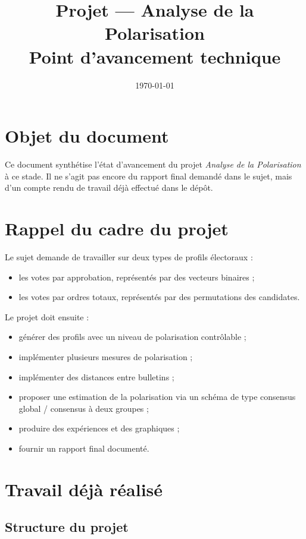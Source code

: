\documentclass[11pt,a4paper]{article}
\title{Projet --- Analyse de la Polarisation\\\large Point d'avancement technique}
\author{}
\date{\today}
\begin{document}
\maketitle

\section{Objet du document}

Ce document synth\'etise l'\'etat d'avancement du projet \emph{Analyse de la Polarisation} \`a ce stade. Il ne s'agit pas encore du rapport final demand\'e dans le sujet, mais d'un compte rendu de travail d\'ej\`a effectu\'e dans le d\'ep\^ot.

\section{Rappel du cadre du projet}

Le sujet demande de travailler sur deux types de profils \'electoraux :
\begin{itemize}[leftmargin=*]
    \item les votes par approbation, repr\'esent\'es par des vecteurs binaires ;
    \item les votes par ordres totaux, repr\'esent\'es par des permutations des candidates.
\end{itemize}

Le projet doit ensuite :
\begin{itemize}[leftmargin=*]
    \item g\'en\'erer des profils avec un niveau de polarisation contr\^olable ;
    \item impl\'ementer plusieurs mesures de polarisation ;
    \item impl\'ementer des distances entre bulletins ;
    \item proposer une estimation de la polarisation via un sch\'ema de type consensus global / consensus \`a deux groupes ;
    \item produire des exp\'eriences et des graphiques ;
    \item fournir un rapport final document\'e.
\end{itemize}

\section{Travail d\'ej\`a r\'ealis\'e}

\subsection{Structure du projet}
\end{document}
